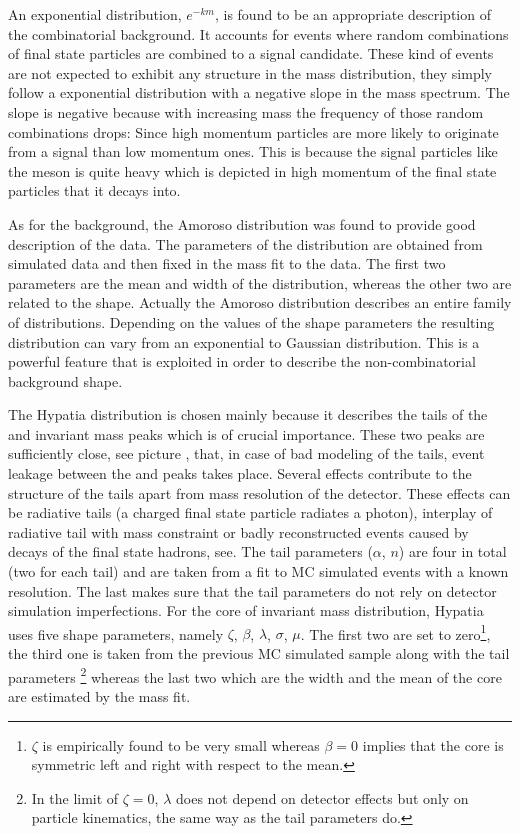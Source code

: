 \noindent An exponential distribution, $e^{-km}$, is found to be an appropriate description of the combinatorial background. It  accounts
for events where random combinations of final state particles are combined to a signal candidate. These kind of events are not expected to
exhibit any structure in the mass distribution, they simply follow a exponential distribution with a negative slope in the mass spectrum.
The slope is negative because with increasing mass the frequency of those random combinations drops: Since high momentum particles are more
likely to originate from a signal than low momentum ones. This is because the signal particles like the \Bs meson is quite heavy which is
depicted in high momentum of the final state particles that it decays into.

As for the \LbJpsippi background, the Amoroso distribution was found to provide good description of the data.
The parameters of the distribution are obtained from simulated data and then fixed in the mass fit to the data. The first two parameters
are the mean and width of the distribution, whereas the other two are related to the shape. Actually the Amoroso distribution describes
an entire family of distributions. Depending on the values of the shape parameters the resulting distribution can vary from an exponential
to Gaussian distribution. This is a powerful feature that is exploited in order to describe the \LbJpsippi non-combinatorial background shape.

The Hypatia distribution is chosen mainly because it describes the tails of the \Bs and \Bd invariant mass peaks which is
of crucial importance. These two peaks are sufficiently close,
see picture , that, in case of bad modeling of the tails, event leakage between the \Bs and \Bd peaks
takes place. Several effects contribute to the structure of the tails apart from mass resolution of the detector. These effects
can be radiative tails (a charged final state particle radiates a photon), interplay of radiative tail with \jpsi mass constraint
or badly reconstructed events caused by decays of the final state hadrons, see\cite{Santos:2013gra}. The tail parameters ($\alpha$, $n$)
are four in total (two for each tail) and are taken from a fit to MC simulated events with a known resolution. The last makes sure that
the tail parameters do not rely on detector simulation imperfections.
For the core of invariant mass distribution, Hypatia uses five shape parameters, namely $\zeta$, $\beta$, $\lambda$, $\sigma$, $\mu$.
The first two are set to zero\footnote{$\zeta$ is empirically found to be very small whereas
$\beta = 0$ implies that the core is symmetric left and right with respect to the mean.}, the third one is taken from the previous
MC simulated sample along with the tail parameters \footnote{In the limit of $\zeta = 0$, $\lambda$ does not depend on detector
effects but only on particle kinematics, the same way as the tail parameters do.} whereas the last two which are the width and
the mean of the core are estimated by the mass fit.

